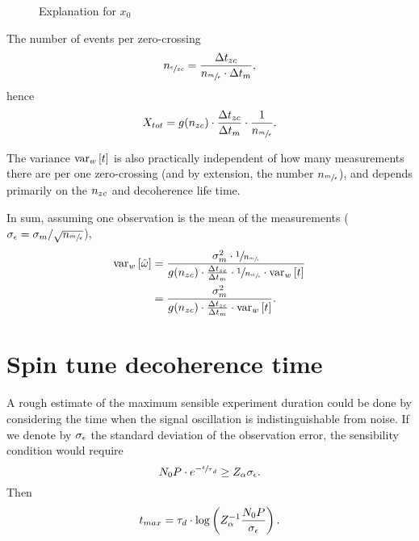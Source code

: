 \documentclass{article}
\newcommand{\obs}{\epsilon}
\newcommand{\meas}{m}
\begin{document}
\begin{figure}[h]
	\centering
	\caption{Explanation for $x_0$\label{fig:x0Expl}}
\end{figure}

The number of events per zero-crossing 
\[
	\Nozc = \frac{\Delta t_{zc}}{\Nmo\cdot \Delta t_{\meas}},
\]
hence
\[
	X_{tot} = g(\Nzc) \cdot \frac{\Delta t_{zc}}{\Delta t_{\meas}}\cdot \frac{1}{\Nmo}.
\]

The variance $\var[w]{t}$ is also practically independent of how many measurements there are per one zero-crossing (and by extension, the number $\Nmo$), and depends primarily on the $n_{zc}$ and decoherence life time.

In sum, assuming one observation is the mean of the measurements ($\SD{\obs} = \SD{\meas}/\sqrt{\Nmo}$), 
\begin{align*}
	\var[w]{\hat{\omega}} &= \frac{\SD{\meas}^2\cdot \sfrac{1}{\Nmo}}{g(\Nzc)\cdot \frac{\Delta t_{zc}}{\Delta t_{\meas}}\cdot \sfrac{1}{\Nmo} \cdot \var[w]{t}} \\
		&= \frac{\SD{\meas}^2}{g(\Nzc)\cdot \frac{\Delta t_{zc}}{\Delta t_{\meas}} \cdot \var[w]{t}}.
\end{align*}


\section{Spin tune decoherence time}

A rough estimate of the maximum sensible experiment duration could be done by considering the time when the signal oscillation is indistinguishable from noise. If we denote by $\SD{\obs}$ the standard deviation of the observation error, the sensibility condition would require
\[
	N_0P\cdot e^{-\sfrac t\tau_d} \geq Z_\alpha \SD{\obs}.
\]
Then 
\[
	t_{max} = \tau_d\cdot \log\bkt{Z_\alpha^{-1}\frac{N_0P}{\SD{\obs}}}.
\]
\end{document}
